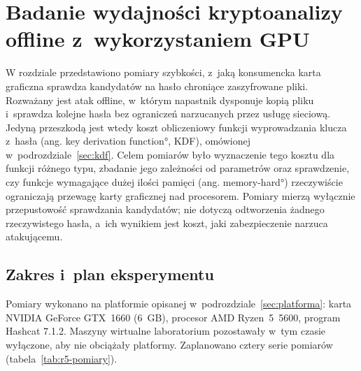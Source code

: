 \chapter{Badanie wydajności kryptoanalizy offline z~wykorzystaniem GPU}\label{ch:gpu}

W rozdziale przedstawiono pomiary szybkości, z~jaką konsumencka karta graficzna sprawdza kandydatów na hasło chroniące zaszyfrowane pliki. Rozważany jest atak offline, w~którym napastnik dysponuje kopią pliku i~sprawdza kolejne hasła bez ograniczeń narzucanych przez usługę sieciową. Jedyną przeszkodą jest wtedy koszt obliczeniowy funkcji wyprowadzania klucza z~hasła (ang. \ang{key derivation function}, KDF), omówionej w~podrozdziale~\ref{sec:kdf}. Celem pomiarów było wyznaczenie tego kosztu dla funkcji różnego typu, zbadanie jego zależności od parametrów oraz sprawdzenie, czy funkcje wymagające dużej ilości pamięci (ang. \ang{memory-hard}) rzeczywiście ograniczają przewagę karty graficznej nad procesorem. Pomiary mierzą wyłącznie przepustowość sprawdzania kandydatów; nie dotyczą odtworzenia żadnego rzeczywistego hasła, a~ich wynikiem jest koszt, jaki zabezpieczenie narzuca atakującemu.

\section{Zakres i~plan eksperymentu}\label{sec:gpu-plan}

Pomiary wykonano na platformie opisanej w~podrozdziale~\ref{sec:platforma}: karta NVIDIA GeForce GTX~1660 (6~GB), procesor AMD Ryzen~5~5600, program Hashcat 7.1.2. Maszyny wirtualne laboratorium pozostawały w~tym czasie wyłączone, aby nie obciążały platformy. Zaplanowano cztery serie pomiarów (tabela~\ref{tab:r5-pomiary}).

